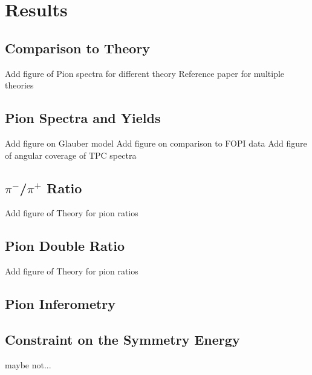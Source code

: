 \chapter{Results}
\section{Comparison to Theory}
Add figure of Pion spectra for different theory 
Reference paper for multiple theories
 
\section{Pion Spectra and Yields}
Add figure on Glauber model 
Add figure on comparison to FOPI data
Add figure of angular coverage of TPC spectra 

\section{$\pi^-$/$\pi^+$ Ratio}
Add figure of Theory for pion ratios

\section{Pion Double Ratio}
Add figure of Theory for pion ratios

\section{Pion Inferometry}

\section{Constraint on the Symmetry Energy}
maybe not...